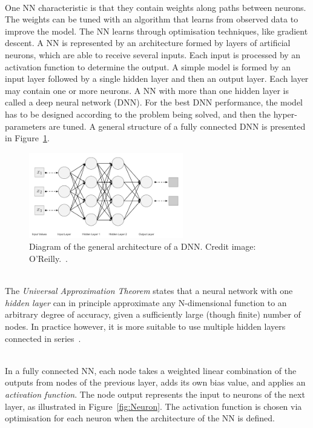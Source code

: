 \ \\One NN characteristic is that they contain weights along paths between neurons. The weights can be tuned with an algorithm that learns from observed data to improve the model. The NN learns through optimisation techniques, like gradient descent. A NN is represented by an architecture formed by layers of artificial neurons, which are able to receive several inputs. Each input is processed by an activation function to determine the output. A simple model is formed by an input layer followed by a single hidden layer and then an output layer. Each layer may contain one or more neurons. A NN with more than one hidden layer is called a deep neural network (DNN). For the best DNN performance, the model has to be designed according to the problem being solved, and then the hyper-parameters are tuned. A general structure of a fully connected DNN is presented in Figure~\ref{fig:DNN}.

\begin{figure}[h]
  \centering
  \includegraphics[width=0.6\textwidth]{./plots/DNNArchitecture.png}
  \caption{Diagram of the general architecture of a DNN. Credit image: O'Reilly.~\cite{OReilly}.}
  \label{fig:DNN}
\end{figure}

\ \\The \emph{Universal Approximation Theorem} states that a neural network with one \emph{hidden layer} can in principle approximate any N-dimensional function to an arbitrary degree of accuracy, given a sufficiently large (though finite) number of nodes. In practice however, it is more suitable to use multiple hidden layers connected in series~\cite{AndrewNg}.

\ \\In a fully connected NN, each node takes a weighted linear combination of the outputs from nodes of the previous layer, adds its own bias value, and applies an \emph{activation function}. The node output represents the input to neurons of the next layer, as illustrated in Figure~\ref{fig:Neuron}. The activation function is chosen via optimisation for each neuron when the architecture of the NN is defined. 

